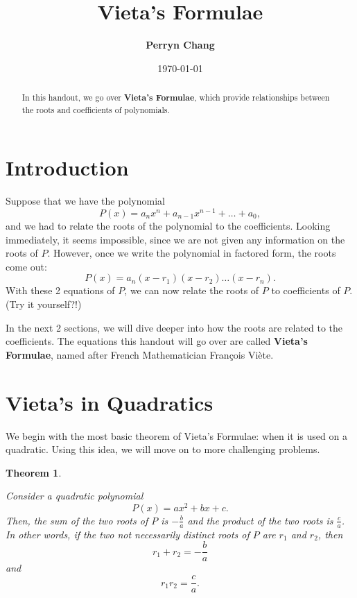 \documentclass[l1pt]{article}
\title{\textbf{Vieta's Formulae}}
\author{\textbf{Perryn Chang}}
\date{\today}
\theoremstyle{plain}
\newtheorem{thm}{Theorem}[section]
\theoremstyle{definition}
\theoremstyle{remark}
\begin{document}
\maketitle

\begin{abstract}
In this handout, we go over \textbf{Vieta's Formulae}, which provide relationships between the roots and coefficients of polynomials.
\end{abstract}

\tableofcontents

\eject

\section{Introduction}

Suppose that we have the polynomial
\[P(x)=a_nx^n+a_{n-1}x^{n-1}+\dots+a_0,\] and we had to relate the roots of the polynomial to the coefficients. Looking immediately, it seems impossible, since we are not given any information on the roots of $P$. However, once we write the polynomial in factored form, the roots come out:
\[P(x)=a_n(x-r_1)(x-r_2)\dots(x-r_n).\] With these 2 equations of $P$, we can now relate the roots of $P$ to coefficients of $P$. (Try it yourself?!)

In the next 2 sections, we will dive deeper into how the roots are related to the coefficients. The equations this handout will go over are called \textbf{Vieta's Formulae}, named after French Mathematician Fran\c{c}ois Vi\`{e}te.


\section{Vieta's in Quadratics}

We begin with the most basic theorem of Vieta's Formulae: when it is used on a quadratic. Using this idea, we will move on to more challenging problems.

\begin{thm}
\label{thm:easyquadratic}
\begin{mdframed}
Consider a quadratic polynomial \[P(x)=ax^2+bx+c.\] Then, the sum of the two roots of $P$ is $-\frac{b}{a}$ and the product of the two roots is $\frac{c}{a}$. In other words, if the two not necessarily distinct roots of $P$ are $r_1$ and $r_2$, then \[r_1+r_2=-\frac{b}{a}\] and \[r_1 r_2=\frac{c}{a}.\]
\end{mdframed}
\end{thm}
\end{document}
